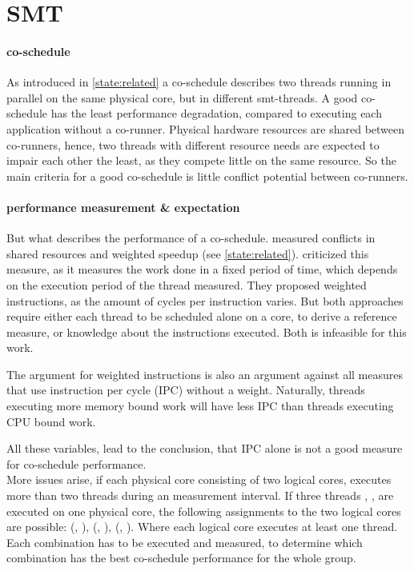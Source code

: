 \section{SMT}
\label{design:smt}

\paragraph{co-schedule}
As introduced in \ref{state:related} a co-schedule describes two threads running
in parallel on the same physical core, but in different \gls{smt}-threads.
A good co-schedule has the least performance degradation,
compared to executing each application without a co-runner.
Physical hardware resources are shared between co-runners, hence, two threads with
different resource needs are expected to impair each other the least, as they
compete little on the same resource.
So the main criteria for a good co-schedule is little conflict potential
between co-runners.

\paragraph{performance measurement \& expectation}
But what describes the performance of a co-schedule.
\citeauthor{snavely_symbiotic_2000} measured conflicts in shared
resources and weighted speedup (see \ref{state:related}).
\citeauthor{eyerman_revisiting_2015} criticized this measure, as it measures
the work done in a fixed period of time, which depends on the execution period
of the thread measured.
They proposed weighted instructions, as the amount of cycles per instruction
varies.
But both approaches require either each thread to be scheduled alone on a core,
to derive a reference measure, or knowledge about the instructions executed.
Both is infeasible for this work.

The argument for weighted instructions is also an argument against all measures
that use instruction per cycle (IPC) without a weight.
Naturally, threads executing more memory bound work will have less IPC than
threads executing CPU bound work.

All these variables, lead to the conclusion, that IPC alone is not a good
measure for co-schedule performance.
\\

More issues arise, if each physical core consisting of two logical cores,
executes more than two threads during an measurement interval.
If three threads \alpha{}, \beta{}, \gamma{} are executed on one physical core,
the following assignments to the two logical cores are possible:
(\alpha{}, \beta{}\gamma{}), (\beta{}, \alpha{}\gamma{}), (\gamma{}, \alpha\beta).
Where each logical core executes at least one thread.
Each combination has to be executed and measured, to determine which
combination has the best co-schedule performance for the whole group.

